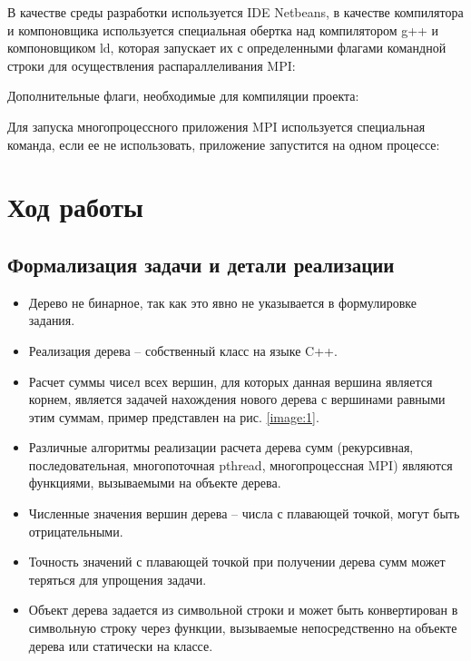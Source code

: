 \documentclass[14pt,a4paper,report]{report}
\begin{document}
В качестве среды разработки используется IDE Netbeans, в качестве компилятора и компоновщика используется специальная обертка над компилятором g++ и компоновщиком ld, которая запускает их с определенными флагами командной строки для осуществления распараллеливания MPI:



Дополнительные флаги, необходимые для компиляции проекта:



Для запуска многопроцессного приложения MPI используется специальная команда, если ее не использовать, приложение запустится на одном процессе:



\section{Ход работы}

\subsection{Формализация задачи и детали реализации}

\begin{itemize}
	\item Дерево не бинарное, так как это явно не указывается в формулировке задания.
	\item Реализация дерева -- собственный класс на языке C++.
	\item Расчет суммы чисел всех вершин, для которых данная вершина является корнем, является задачей нахождения нового дерева с вершинами равными этим суммам, пример представлен на рис. \ref{image:1}.
	\item Различные алгоритмы реализации расчета дерева сумм (рекурсивная, последовательная, многопоточная pthread, многопроцессная MPI) являются функциями, вызываемыми на объекте дерева.
	\item Численные значения вершин дерева -- числа с плавающей точкой, могут быть отрицательными.
	\item Точность значений с плавающей точкой при получении дерева сумм может теряться для упрощения задачи.
	\item Объект дерева задается из символьной строки и может быть конвертирован в символьную строку через функции, вызываемые непосредственно на объекте дерева или статически на классе.
\end{itemize}
\end{document}
